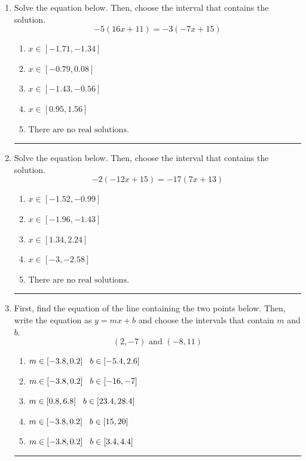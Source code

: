 \documentclass[14pt]{extbook}
\newcommand{\litem}[1]{\item#1\hspace*{-1cm}\rule{\textwidth}{0.4pt}}
\begin{document}
\begin{enumerate}
\litem{
Solve the equation below. Then, choose the interval that contains the solution.\[ -5(16x + 11) = -3(-7x + 15) \]\begin{enumerate}[label=\Alph*.]
\item \( x \in [-1.71, -1.34] \)
\item \( x \in [-0.79, 0.08] \)
\item \( x \in [-1.43, -0.56] \)
\item \( x \in [0.95, 1.56] \)
\item \( \text{There are no real solutions.} \)

\end{enumerate} }
\litem{
Solve the equation below. Then, choose the interval that contains the solution.\[ -2(-12x + 15) = -17(7x + 13) \]\begin{enumerate}[label=\Alph*.]
\item \( x \in [-1.52, -0.99] \)
\item \( x \in [-1.96, -1.43] \)
\item \( x \in [1.34, 2.24] \)
\item \( x \in [-3, -2.58] \)
\item \( \text{There are no real solutions.} \)

\end{enumerate} }
\litem{
First, find the equation of the line containing the two points below. Then, write the equation as $ y=mx+b $ and choose the intervals that contain $m$ and $b$.\[ (2, -7) \text{ and } (-8, 11) \]\begin{enumerate}[label=\Alph*.]
\item \( m \in [-3.8, 0.2] \hspace*{3mm} b \in [-5.4, 2.6] \)
\item \( m \in [-3.8, 0.2] \hspace*{3mm} b \in [-16, -7] \)
\item \( m \in [0.8, 6.8] \hspace*{3mm} b \in [23.4, 28.4] \)
\item \( m \in [-3.8, 0.2] \hspace*{3mm} b \in [15, 20] \)
\item \( m \in [-3.8, 0.2] \hspace*{3mm} b \in [3.4, 4.4] \)


\end{enumerate}}
\end{enumerate}
\end{document}
